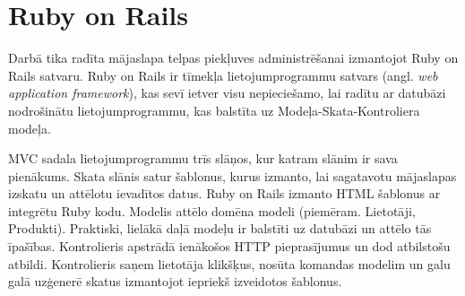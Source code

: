 
\chapter{Ruby on Rails}
Darbā tika radīta mājaslapa telpas piekļuves administrēšanai izmantojot Ruby on Rails satvaru. Ruby on Rails ir tīmekļa lietojumprogrammu satvars (angl. \textit{web application framework}), kas  sevī ietver visu nepieciešamo, lai radītu ar datubāzi nodrošinātu lietojumprogrammu, kas balstīta uz Modeļa-Skata-Kontroliera  modeļa.

MVC sadala lietojumprogrammu trīs slāņos, kur katram slānim ir sava pienākums.
Skata slānis satur šablonus, kurus izmanto, lai sagatavotu mājaslapas izskatu un attēlotu ievadītos datus. Ruby on Rails izmanto HTML šablonus ar integrētu Ruby kodu.
Modelis attēlo domēna modeli (piemēram. Lietotāji, Produkti). Praktiski, lielākā daļā modeļu ir balstīti uz datubāzi un attēlo tās īpašības.
Kontrolieris apstrādā ienākošos HTTP pieprasījumus un dod atbilstošu atbildi. Kontrolieris saņem lietotāja klikšķus, nosūta komandas modelim un galu galā uzģenerē skatus izmantojot iepriekš izveidotos šablonus.

